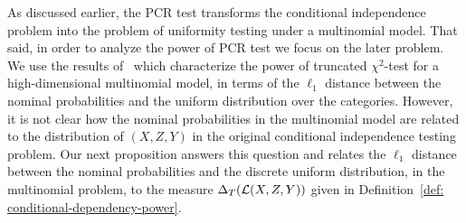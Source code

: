 \documentclass[11pt]{article}
\begin{document}
 


As discussed earlier, the PCR test transforms the conditional independence problem into the problem of uniformity testing under a multinomial model. That said, in order to analyze the power of PCR test we focus on the later problem.
We use the results of~\cite{balakrishnan2019hypothesis} which characterize the power of truncated $\chi^2$-test for a high-dimensional multinomial model, in terms of the $\ell_1$ distance between the nominal probabilities and the uniform distribution over the categories. However, it is not clear how the nominal probabilities in the multinomial model are related to the distribution of $(X,Z,Y)$ in the original conditional independence testing problem. Our next proposition answers this question and relates the $\ell_1$ distance between the nominal probabilities and the discrete uniform distribution, in the multinomial problem, to the measure $\Delta_T(\mathcal{L}(X,Z,Y))$ given in Definition~\ref{def: conditional-dependency-power}.
\end{document}

